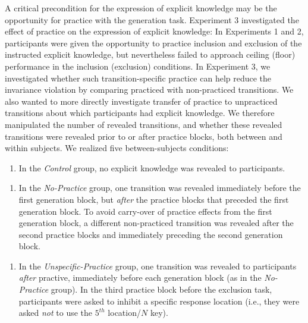 \documentclass[floatsintext,man]{apa6}
\providecommand{\tightlist}{%
  \setlength{\itemsep}{0pt}\setlength{\parskip}{0pt}}
\begin{document}
A critical precondition for the expression of explicit knowledge may be
the opportunity for practice with the generation task. Experiment 3
investigated the effect of practice on the expression of explicit
knowledge: In Experiments 1 and 2, participants were given the
opportunity to practice inclusion and exclusion of the instructed
explicit knowledge, but nevertheless failed to approach ceiling (floor)
performance in the inclusion (exclusion) conditions. In Experiment 3, we
investigated whether such transition-specific practice can help reduce
the invariance violation by comparing practiced with non-practiced
transitions. We also wanted to more directly investigate transfer of
practice to unpracticed transitions about which participants had
explicit knowledge. We therefore manipulated the number of revealed
transitions, and whether these revealed transitions were revealed prior
to or after practice blocks, both between and within subjects. We
realized five between-subjects conditions:

\begin{enumerate}
\def\labelenumi{\arabic{enumi}.}
\tightlist
\item
  In the \emph{Control} group, no explicit knowledge was revealed to
  participants.
\end{enumerate}

\begin{enumerate}
\def\labelenumi{\arabic{enumi}.}
\setcounter{enumi}{1}
\tightlist
\item
  In the \emph{No-Practice} group, one transition was revealed
  immediately before the first generation block, but \emph{after} the
  practice blocks that preceded the first generation block. To avoid
  carry-over of practice effects from the first generation block, a
  different non-practiced transition was revealed after the second
  practice blocks and immediately preceding the second generation block.
\end{enumerate}

\begin{enumerate}
\def\labelenumi{\arabic{enumi}.}
\setcounter{enumi}{2}
\tightlist
\item
  In the \emph{Unspecific-Practice} group, one transition was revealed
  to participants \emph{after} practive, immediately before each
  generation block (as in the \emph{No-Practice} group). In the third
  practice block before the exclusion task, participants were asked to
  inhibit a specific response location (i.e., they were asked \emph{not}
  to use the \(5^{th}\) location/\(N\) key).
\end{enumerate}
\end{document}
